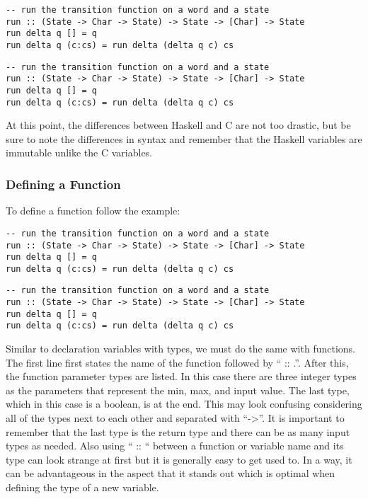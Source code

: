 \documentclass{article}
\begin{document}
\begin{lstlisting}
-- run the transition function on a word and a state
run :: (State -> Char -> State) -> State -> [Char] -> State
run delta q [] = q
run delta q (c:cs) = run delta (delta q c) cs 
\end{lstlisting}

\begin{lstlisting}
-- run the transition function on a word and a state
run :: (State -> Char -> State) -> State -> [Char] -> State
run delta q [] = q
run delta q (c:cs) = run delta (delta q c) cs 
\end{lstlisting}

\medskip\noindent
At this point, the differences between Haskell and C are not too drastic, but be sure to note the differences in syntax and remember that the Haskell variables are immutable unlike the C variables.

\subsubsection{Defining a Function}
\medskip\noindent
To define a function follow the example:

\begin{lstlisting}
-- run the transition function on a word and a state
run :: (State -> Char -> State) -> State -> [Char] -> State
run delta q [] = q
run delta q (c:cs) = run delta (delta q c) cs 
\end{lstlisting}

\begin{lstlisting}
-- run the transition function on a word and a state
run :: (State -> Char -> State) -> State -> [Char] -> State
run delta q [] = q
run delta q (c:cs) = run delta (delta q c) cs 
\end{lstlisting}

\medskip\noindent
Similar to declaration variables with types, we must do the same with functions. The first line first states the name of the function followed by “ :: .”. After this, the function parameter types are listed. In this case there are three integer types as the parameters that represent the min, max, and input value. The last type, which in this case is a boolean, is at the end. This may look confusing considering all of the types next to each other and separated with “->”. It is important to remember that the last type is the return type and there can be as many input types as needed. Also using “ :: “ between a function or variable name and its type can look strange at first but it is generally easy to get used to. In a way, it can be advantageous in the aspect that it stands out which is optimal when defining the type of a new variable.
\end{document}
